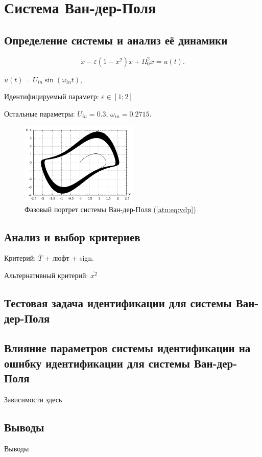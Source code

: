 
\FloatBarrier
\section{Система Ван-дер-Поля} %
\label{atu:sect:vdp}


\subsection{Определение системы и анализ её динамики} %

\begin{equation}
 \ddot{x} - \varepsilon (1-x^2)  \dot{x} + \Omega_0^2 x  = u(t) .
\label{atu:eq:vdp}
\end{equation}

\( u(t) = U_{in} \sin ( \omega_{in} t ) \),

Идентифицируемый параметр:
\( \varepsilon \in [1;2]  \)

Остальные параметры:
\(U_{in}=0.3\),
\(\omega_{in}=0.2715\).


\begin{figure}[htb!]
\centerline{\includegraphics[width=0.5\textwidth]{p/cha/vdp_phase.pdf} }
\caption{Фазовый портрет системы Ван-дер-Поля (\ref{atu:eq:vdp})}
\label{atu:f:vdp_phase}
\end{figure}



\subsection{Анализ и выбор критериев}  %

Критерий:
$\overline{T}$ + люфт + sign.

Альтернативный критерий:
$\overline{x^2}$


\subsection{Тестовая задача идентификации для системы Ван-дер-Поля}  %



\subsection{Влияние параметров системы идентификации на ошибку идентификации для системы Ван-дер-Поля}  %


Зависимости здесь


\subsection{Выводы}  %

Выводы





